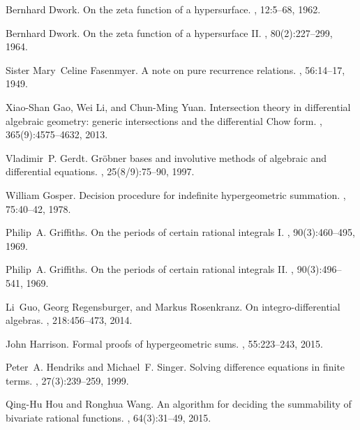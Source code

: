 \documentclass{jssc}
\begin{document}
\begin{thebibliography}{199}
Bernhard Dwork.
\newblock On the zeta function of a hypersurface.
, 12:5--68, 1962.

Bernhard Dwork.
\newblock On the zeta function of a hypersurface {II}.
, 80(2):227--299, 1964.

Sister Mary~Celine Fasenmyer.
\newblock A note on pure recurrence relations.
, 56:14--17, 1949.

Xiao-Shan Gao, Wei Li, and Chun-Ming Yuan.
\newblock Intersection theory in differential algebraic geometry: generic
  intersections and the differential {C}how form.
, 365(9):4575--4632, 2013.

Vladimir~P. Gerdt.
\newblock Gr{\"o}bner bases and involutive methods of algebraic and
  differential equations.
, 25(8/9):75--90, 1997.

William Gosper.
\newblock Decision procedure for indefinite hypergeometric summation.
, 75:40--42, 1978.

Philip~A. Griffiths.
\newblock On the periods of certain rational integrals {I}.
, 90(3):460--495, 1969.

Philip~A. Griffiths.
\newblock On the periods of certain rational integrals {II}.
, 90(3):496--541, 1969.

Li~Guo, Georg Regensburger, and Markus Rosenkranz.
\newblock On integro-differential algebras.
, 218:456--473, 2014.

John Harrison.
\newblock Formal proofs of hypergeometric sums.
, 55:223--243, 2015.

Peter~A. Hendriks and Michael~F. Singer.
\newblock Solving difference equations in finite terms.
, 27(3):239--259, 1999.

Qing-Hu Hou and Ronghua Wang.
\newblock An algorithm for deciding the summability of bivariate rational
  functions.
, 64(3):31--49, 2015.


\end{thebibliography}
\end{document}
